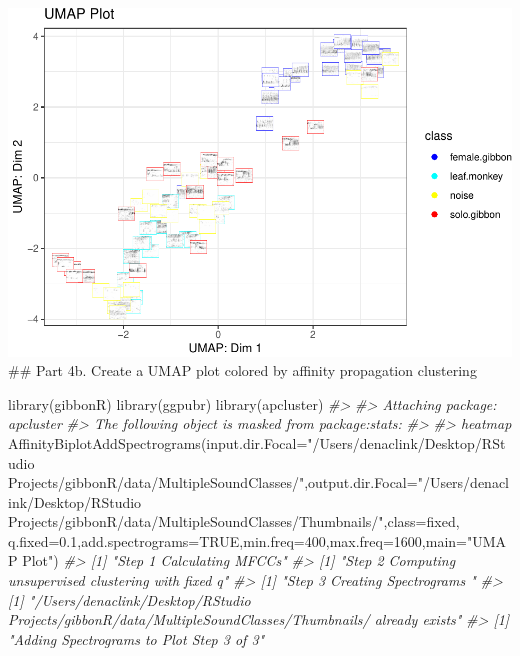\documentclass[
]{book}
\newenvironment{Shaded}{\begin{snugshade}}{\end{snugshade}}
\newcommand{\AttributeTok}[1]{\textcolor[rgb]{0.77,0.63,0.00}{#1}}
\newcommand{\CommentTok}[1]{\textcolor[rgb]{0.56,0.35,0.01}{\textit{#1}}}
\newcommand{\ConstantTok}[1]{\textcolor[rgb]{0.00,0.00,0.00}{#1}}
\newcommand{\DecValTok}[1]{\textcolor[rgb]{0.00,0.00,0.81}{#1}}
\newcommand{\FloatTok}[1]{\textcolor[rgb]{0.00,0.00,0.81}{#1}}
\newcommand{\FunctionTok}[1]{\textcolor[rgb]{0.00,0.00,0.00}{#1}}
\newcommand{\NormalTok}[1]{#1}
\newcommand{\StringTok}[1]{\textcolor[rgb]{0.31,0.60,0.02}{#1}}
\begin{document}
\includegraphics{gibbonR_tutorial_files/figure-latex/unnamed-chunk-14-1.pdf}
\#\# Part 4b. Create a UMAP plot colored by affinity propagation clustering

\begin{Shaded}
\begin{Highlighting}[]
\FunctionTok{library}\NormalTok{(gibbonR)}
\FunctionTok{library}\NormalTok{(ggpubr)}
\FunctionTok{library}\NormalTok{(apcluster)}
\CommentTok{\#\textgreater{} }
\CommentTok{\#\textgreater{} Attaching package: \textquotesingle{}apcluster\textquotesingle{}}
\CommentTok{\#\textgreater{} The following object is masked from \textquotesingle{}package:stats\textquotesingle{}:}
\CommentTok{\#\textgreater{} }
\CommentTok{\#\textgreater{}     heatmap}
\FunctionTok{AffinityBiplotAddSpectrograms}\NormalTok{(}\AttributeTok{input.dir.Focal=}\StringTok{"/Users/denaclink/Desktop/RStudio Projects/gibbonR/data/MultipleSoundClasses/"}\NormalTok{,}\AttributeTok{output.dir.Focal=}\StringTok{"/Users/denaclink/Desktop/RStudio Projects/gibbonR/data/MultipleSoundClasses/Thumbnails/"}\NormalTok{,}\AttributeTok{class=}\StringTok{\textquotesingle{}fixed\textquotesingle{}}\NormalTok{, }\AttributeTok{q.fixed=}\FloatTok{0.1}\NormalTok{,}\AttributeTok{add.spectrograms=}\ConstantTok{TRUE}\NormalTok{,}\AttributeTok{min.freq=}\DecValTok{400}\NormalTok{,}\AttributeTok{max.freq=}\DecValTok{1600}\NormalTok{,}\AttributeTok{main=}\StringTok{"UMAP Plot"}\NormalTok{)}
\CommentTok{\#\textgreater{} [1] "Step 1 Calculating MFCCs"}
\CommentTok{\#\textgreater{} [1] "Step 2 Computing unsupervised clustering with fixed q"}
\CommentTok{\#\textgreater{} [1] "Step 3 Creating Spectrograms "}
\CommentTok{\#\textgreater{} [1] "/Users/denaclink/Desktop/RStudio Projects/gibbonR/data/MultipleSoundClasses/Thumbnails/ already exists"}
\CommentTok{\#\textgreater{} [1] "Adding Spectrograms to Plot Step 3 of 3"}
\end{Highlighting}
\end{Shaded}
\end{document}

